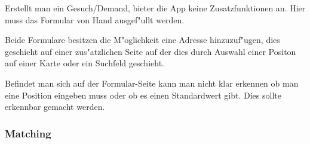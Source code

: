 Erstellt man ein Gesuch/Demand, bieter die App keine Zusatzfunktionen an. 
Hier muss das Formular von Hand ausgef"ullt werden.

Beide Formulare besitzen die M"oglichkeit eine Adresse hinzuzuf"ugen, dies geschieht auf einer zus"atzlichen Seite auf der dies durch Auswahl einer Positon auf einer Karte oder ein Suchfeld geschieht.

Befindet man sich auf der Formular-Seite kann man nicht klar erkennen ob man eine Position eingeben muss oder ob es einen Standardwert gibt. 
Dies sollte erkennbar gemacht werden.
 
\subsubsection{Matching}
\begin{figure}[H]
 

\end{figure}
